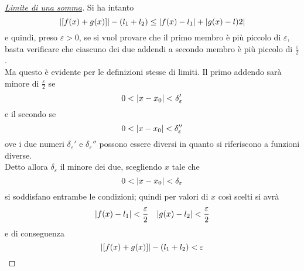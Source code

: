 \begin{proof}[\protect\hyperlink{teor:sommaLimiti}{Limite di una somma}]
	Si ha intanto
	\begin{equation*}
	\lvert[f(x)+g(x)]\rvert-(l_1+l_2)\leq\lvert f(x)-l_1\rvert+\lvert g(x)-l)2\rvert
	\end{equation*}
	e quindi, preso $\varepsilon>0$, se si vuol provare che il primo membro è più piccolo di 
	$\varepsilon$, basta verificare che ciascuno dei due addendi a secondo membro è più piccolo di
	$\frac{\varepsilon}{2}$.\\
	Ma questo è evidente per le definizioni stesse di limiti. Il primo addendo sarà minore di 
	$\frac{\varepsilon}{2}$ se
	\begin{equation*}
	0<\lvert x-x_0\rvert<\delta_\varepsilon'
	\end{equation*}
	e il secondo se
	\begin{equation*}
	0<\lvert x-x_0\rvert<\delta_\varepsilon''
	\end{equation*}
	ove i due numeri $\delta_\varepsilon'$ e $\delta_\varepsilon''$ possono essere diversi in quanto 
	si riferiscono a funzioni diverse.\\
	Detto allora $\delta_\varepsilon$ il minore dei due, scegliendo $x$ tale che
	\begin{equation*}
	0<\lvert x-x_0\rvert<\delta_\varepsilon
	\end{equation*}
	si soddisfano entrambe le condizioni; quindi per valori di $x$ così scelti si avrà
	\begin{equation*}
	\lvert f(x)-l_1\rvert<\frac{\varepsilon}{2}\quad\lvert g(x)-l_2\rvert<\frac{\varepsilon}{2}
	\end{equation*}
	e di conseguenza
	\begin{equation*}
	\lvert[f(x)+g(x)]\rvert-(l_1+l_2)<\varepsilon
	\end{equation*}
\end{proof}

